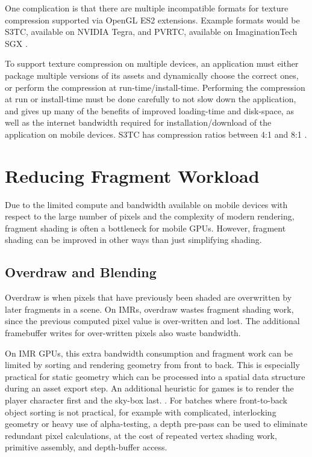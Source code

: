 One complication is that there are multiple incompatible formats for texture
compression supported via OpenGL ES2 extensions.  Example formats would be
S3TC, available on NVIDIA Tegra, and PVRTC, available on ImaginationTech SGX
\cite{Motorola11}.

To support texture compression on multiple devices, an application must either
package multiple versions of its assets and dynamically choose the correct
ones, or perform the compression at run-time/install-time.  Performing the
compression at run or install-time must be done carefully to not slow down the
application, and gives up many of the benefits of improved loading-time and
disk-space, as well as the internet bandwidth required for
installation/download of the application on mobile devices.  S3TC has
compression ratios between 4:1 and 8:1 \cite{Domine00}.

\section{Reducing Fragment Workload}
\label{Jon-McCaffrey-Reducing-Fragment-Workload}


Due to the limited compute and bandwidth available on mobile devices with
respect to the large number of pixels and the complexity of modern rendering,
fragment shading is often a bottleneck for mobile GPUs.  However, fragment
shading can be improved in other ways than just simplifying shading.

\subsection{Overdraw and Blending}\label{Jon-McCaffrey-Overdraw-And-Blending}
Overdraw is when pixels that have previously been shaded are overwritten by
later fragments in a scene.  On IMRs, overdraw wastes fragment shading work,
since the previous computed pixel value is over-written and lost.  The
additional framebuffer writes for over-written pixels also waste bandwidth.

On IMR GPUs, this extra bandwidth consumption and fragment work can be limited
by sorting and rendering geometry from front to back.  This is especially
practical for static geometry which can be processed into a spatial data
structure during an asset export step.  An additional heuristic for games is to
render the player character first and the sky-box last.
\cite{Pranckevicius11a}.  For batches where front-to-back object sorting is not
practical, for example with complicated, interlocking geometry or heavy use of
alpha-testing, a depth pre-pass can be used to eliminate redundant pixel
calculations, at the cost of repeated vertex shading work, primitive assembly,
and depth-buffer access.

